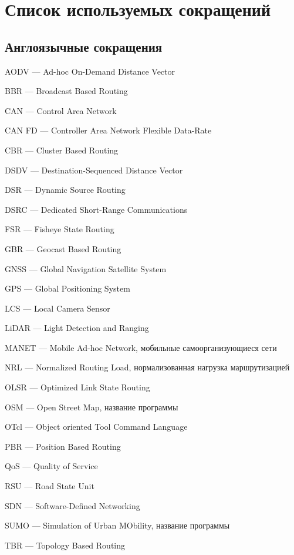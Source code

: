 \chapter*{Список используемых сокращений}

\section*{Англоязычные сокращения}

\mbox{}

AODV --- Ad-hoc On-Demand Distance Vector

BBR --- Broadcast Based Routing

CAN --- Control Area Network

CAN FD --- Controller Area Network Flexible Data-Rate

CBR --- Cluster Based Routing

DSDV --- Destination-Sequenced Distance Vector

DSR --- Dynamic Source Routing

DSRC --- Dedicated Short-Range Communications

FSR --- Fisheye State Routing

GBR --- Geocast Based Routing

GNSS --- Global Navigation Satellite System

GPS --- Global Positioning System

LCS --- Local Camera Sensor

LiDAR --- Light Detection and Ranging

MANET --- Mobile Ad-hoc Network, мобильные самоорганизующиеся сети

NRL --- Normalized Routing Load, нормализованная нагрузка маршрутизацией

OLSR --- Optimized Link State Routing

OSM --- Open Street Map, название программы

OTcl --- Object oriented Tool Command Language

PBR --- Position Based Routing

QoS --- Quality of Service

RSU --- Road State Unit

SDN --- Software-Defined Networking

SUMO --- Simulation of Urban MObility, название программы

TBR --- Topology Based Routing

